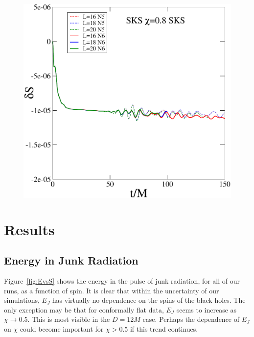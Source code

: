 \begin{figure}
  \includegraphics[width=0.95\columnwidth]{chap5/dS_SKS_S8}
\end{figure}





\section{Results}
\label{sec:Results}




\subsection{Energy in Junk Radiation}

Figure~\ref{fig:EvsS} shows the energy in the pulse of junk radiation,
for all of our runs, as a function of spin. It is clear that within
the uncertainty of our simulations, $E_J$ has virtually no dependence
on the spins of the black holes. The only exception may be that for
conformally flat data, $E_J$ seems to increase as $\chi\rightarrow
0.5$. This is most visible in the $D=12M$ case. Perhaps the dependence
of $E_J$ on $\chi$ could become important for $\chi > 0.5$ if this
trend continues.

